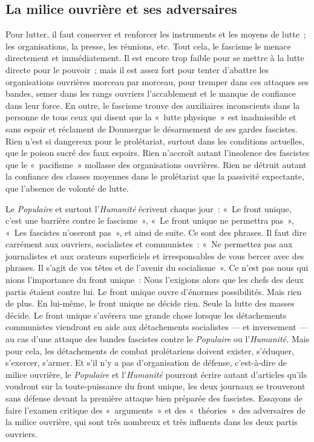 \documentclass[french,twoside]{book} %
\begin{document}
\subsection[{La milice ouvrière et ses adversaires}]{La milice ouvrière et ses adversaires}
\noindent Pour lutter, il faut conserver et renforcer les instruments et les moyens de lutte ; les organisations, la presse, les réunions, etc. Tout cela, le fascisme le menace directement et immédiatement. Il est encore trop faible pour se mettre à la lutte directe pour le pouvoir ; mais il est assez fort pour tenter d’abattre les organisations ouvrières morceau par morceau, pour tremper dans ces attaques ses bandes, semer dans les rangs ouvriers l’accablement et le manque de confiance dans leur force. En outre, le fascisme trouve des auxiliaires inconscients dans la personne de tous ceux qui disent que la « lutte physique » est inadmissible et sans espoir et réclament de Doumergue le désarmement de ses gardes fascistes. Rien n’est si dangereux pour le prolétariat, surtout dans les conditions actuelles, que le poison sucré des faux espoirs. Rien n’accroît autant l’insolence des fascistes que le « pacifisme » mollasse des organisations ouvrières. Rien ne détruit autant la confiance des classes moyennes dans le  prolétariat que la passivité expectante, que l’absence de volonté de lutte.\par
Le \emph{Populaire} et surtout l’\emph{Humanité} écrivent chaque jour : « Le front unique, c’est une barrière contre le fascisme », « Le front unique ne permettra pas », « Les fascistes n’oseront pas », et ainsi de suite. Ce sont des phrases. Il faut dire carrément aux ouvriers, socialistes et communistes : « Ne permettez pas aux journalistes et aux orateurs superficiels et irresponsables de vous bercer avec des phrases. Il s’agit de vos têtes et de l’avenir du socialisme ». Ce n’est pas nous qui nions l’importance du front unique : Nous l’exigions alors que les chefs des deux partis étaient contre lui. Le front unique ouvre d’énormes possibilités. Mais rien de plus. En lui-même, le front unique ne décide rien. Seule la lutte des masses décide. Le front unique s’avérera une grande chose lorsque les détachements communistes viendront en aide aux détachements socialistes — et inversement — au cas d’une attaque des bandes fascistes contre le \emph{Populaire} ou l’\emph{Humanité.} Mais pour cela, les détachements de combat prolétariens doivent exister, s’éduquer, s’exercer, s’armer. Et s’il n’y a pas d’organisation de défense, c’est-à-dire de milice ouvrière, le \emph{Populaire} et l’\emph{Humanité} pourront écrire autant d’articles qu’ils voudront sur la toute-puissance du front unique, les deux journaux se trouveront sans défense devant la première attaque bien préparée des fascistes. Essayons de faire l’examen critique des « arguments » et des « théories » des adversaires de la milice ouvrière, qui sont très nombreux et très influents dans les deux partis ouvriers.\par
\end{document}
